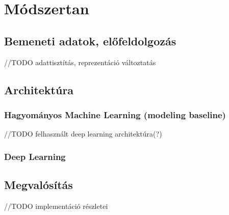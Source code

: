 \chapter{Módszertan} 
\label{ch:methodology}

\section{Bemeneti adatok, előfeldolgozás}

//TODO adattisztítás, reprezentáció változtatás

\section{Architektúra}

\subsection{Hagyományos Machine Learning (modeling baseline)}
//TODO felhasznált deep learning architektúra(?)

\subsection{Deep Learning}

\section{Megvalósítás}

//TODO implementáció részletei
